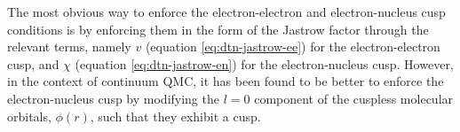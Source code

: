 The most obvious way to enforce the electron-electron and electron-nucleus cusp conditions is by enforcing them in the form of the Jastrow factor through the relevant terms, namely $v$ (equation \ref{eq:dtn-jastrow-ee}) for the electron-electron cusp, and $\chi$ (equation \ref{eq:dtn-jastrow-en}) for the electron-nucleus cusp. However, in the context of continuum \gls{QMC}, it has been found to be better\supercite{drummondJastrow,needsVariational2020,maScheme2005} to enforce the electron-nucleus cusp by modifying the $l=0$ component of the cuspless molecular orbitals, $\phi(r)$, such that they exhibit a cusp.




